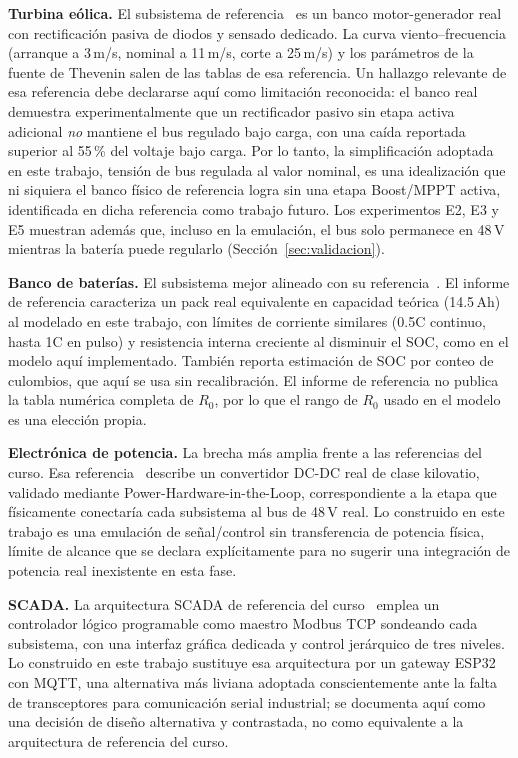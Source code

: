 \documentclass[conference]{IEEEtran}
\begin{document}
\textbf{Turbina eólica.} El subsistema de referencia~\cite{gonzalez2026eolica} es un banco motor-generador real con rectificación pasiva de diodos y sensado dedicado. La curva viento--frecuencia (arranque a 3\,m/s, nominal a 11\,m/s, corte a 25\,m/s) y los parámetros de la fuente de Thevenin salen de las tablas de esa referencia. Un hallazgo relevante de esa referencia debe declararse aquí como limitación reconocida: el banco real demuestra experimentalmente que un rectificador pasivo sin etapa activa adicional \emph{no} mantiene el bus regulado bajo carga, con una caída reportada superior al 55\,\% del voltaje bajo carga. Por lo tanto, la simplificación adoptada en este trabajo, tensión de bus regulada al valor nominal, es una idealización que ni siquiera el banco físico de referencia logra sin una etapa Boost/MPPT activa, identificada en dicha referencia como trabajo futuro. Los experimentos E2, E3 y E5 muestran además que, incluso en la emulación, el bus solo permanece en 48\,V mientras la batería puede regularlo (Sección~\ref{sec:validacion}).

\textbf{Banco de baterías.} El subsistema mejor alineado con su referencia~\cite{vega2026bateria}. El informe de referencia caracteriza un pack real equivalente en capacidad teórica (14.5\,Ah) al modelado en este trabajo, con límites de corriente similares (0.5C continuo, hasta 1C en pulso) y resistencia interna creciente al disminuir el SOC, como en el modelo aquí implementado. También reporta estimación de SOC por conteo de culombios, que aquí se usa sin recalibración. El informe de referencia no publica la tabla numérica completa de $R_0$, por lo que el rango de $R_0$ usado en el modelo es una elección propia.

\textbf{Electrónica de potencia.} La brecha más amplia frente a las referencias del curso. Esa referencia~\cite{pinto2026peb} describe un convertidor DC-DC real de clase kilovatio, validado mediante Power-Hardware-in-the-Loop, correspondiente a la etapa que físicamente conectaría cada subsistema al bus de 48\,V real. Lo construido en este trabajo es una emulación de señal/control sin transferencia de potencia física, límite de alcance que se declara explícitamente para no sugerir una integración de potencia real inexistente en esta fase.

\textbf{SCADA.} La arquitectura SCADA de referencia del curso~\cite{alvarez2026scada} emplea un controlador lógico programable como maestro Modbus TCP sondeando cada subsistema, con una interfaz gráfica dedicada y control jerárquico de tres niveles. Lo construido en este trabajo sustituye esa arquitectura por un gateway ESP32 con MQTT, una alternativa más liviana adoptada conscientemente ante la falta de transceptores para comunicación serial industrial; se documenta aquí como una decisión de diseño alternativa y contrastada, no como equivalente a la arquitectura de referencia del curso.
\end{document}
